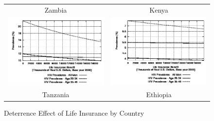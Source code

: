\documentclass[12pt]{article}
\begin{document}
\begin{figure}
\begin{center}
\caption{Deterrence Effect of Life Insurance by Country}\label{fg:bycountry}
\vspace*{1pc}
\begin{tabular}{cc}
Zambia  & Kenya \\
\includegraphics[scale=0.44]{images/hivB010_Zambia.png} & \includegraphics[scale=0.44]{images/hivB010_Kenya.png} \\
Tanzania & Ethiopia \\

\end{tabular}
\end{center}
\end{figure}
\end{document}
